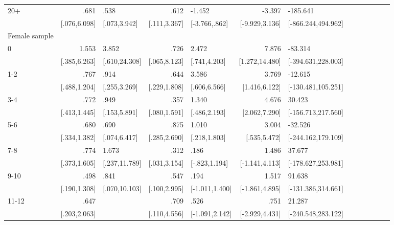 \begin{table}[h]
\begin{adjustbox}{max width=\linewidth}
\begin{threeparttable}
{\begin{tabular}{l*{6}{D{.}{.}{-1}l}}
20+             &            .681&            .538&            .612&          -1.452&          -3.397&        -185.641\\
                &    [.076,6.098]&    [.073,3.942]&    [.111,3.367]&   [-3.766,.862]&  [-9.929,3.136]&[-866.244,494.962]\\
\midrule
Female sample &&&&&&\\
0               &           1.553&           3.852&            .726&           2.472&           7.876&         -83.314\\
                &    [.385,6.263]&   [.610,24.308]&    [.065,8.123]&    [.741,4.203]&  [1.272,14.480]&[-394.631,228.003]\\

1-2             &            .767&            .914&            .644&           3.586&           3.769&         -12.615\\
                &    [.488,1.204]&    [.255,3.269]&    [.229,1.808]&    [.606,6.566]&   [1.416,6.122]&[-130.481,105.251]\\

3-4             &            .772&            .949&            .357&           1.340&           4.676&          30.423\\
                &    [.413,1.445]&    [.153,5.891]&    [.080,1.591]&    [.486,2.193]&   [2.062,7.290]&[-156.713,217.560]\\

5-6             &            .680&            .690&            .875&           1.010&           3.004&         -32.526\\
                &    [.334,1.382]&    [.074,6.417]&    [.285,2.690]&    [.218,1.803]&    [.535,5.472]&[-244.162,179.109]\\

7-8             &            .774&           1.673&            .312&            .186&           1.486&          37.677\\
                &    [.373,1.605]&   [.237,11.789]&    [.031,3.154]&   [-.823,1.194]&  [-1.141,4.113]&[-178.627,253.981]\\

9-10            &            .498&            .841&            .547&            .194&           1.517&          91.638\\
                &    [.190,1.308]&   [.070,10.103]&    [.100,2.995]&  [-1.011,1.400]&  [-1.861,4.895]&[-131.386,314.661]\\

11-12           &            .647&                &            .709&            .526&            .751&          21.287\\
                &    [.203,2.063]&                &    [.110,4.556]&  [-1.091,2.142]&  [-2.929,4.431]&[-240.548,283.122]\\


\end{tabular}}
\end{threeparttable}
\end{adjustbox}
\end{table}
